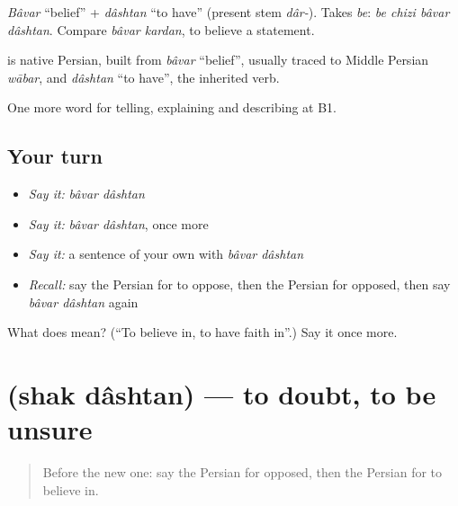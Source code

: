 \emph{Bâvar} \textquotedblleft{}belief\textquotedblright{} + \emph{dâshtan} \textquotedblleft{}to have\textquotedblright{} (present stem \emph{dâr-}). Takes \emph{be}: \emph{be chizi bâvar dâshtan}. Compare \emph{bâvar kardan}, to believe a statement.

\begin{cousinweb}
\textbf{ } is native Persian, built from \emph{bâvar} \textquotedblleft{}belief\textquotedblright{}, usually traced to Middle Persian \emph{wābar}, and \emph{dâshtan} \textquotedblleft{}to have\textquotedblright{}, the inherited verb.
\end{cousinweb}

\begin{grammarlens}[title={What you've built}]
One more word for telling, explaining and describing at B1.
\end{grammarlens}

\subsection*{Your turn}
\begin{itemize}
\raggedright
  \item \emph{Say it:} \emph{bâvar dâshtan}
  \item \emph{Say it:} \emph{bâvar dâshtan}, once more
  \item \emph{Say it:} a sentence of your own with \emph{bâvar dâshtan}
  \item \emph{Recall:} say the Persian for to oppose, then the Persian for opposed, then say \emph{bâvar dâshtan} again
\end{itemize}

\begin{tcolorbox}[breakable,colback=teal!4,colframe=teal!35!black,title={Before you move on}]
What does   mean? (\textquotedblleft{}To believe in, to have faith in\textquotedblright{}.) Say it once more.
\end{tcolorbox}
\section[\texorpdfstring{\fa{شک} \fa{داشتن} (shak dâshtan)}{شک داشتن (shak dâshtan)}]{  (shak dâshtan) — to doubt, to be unsure}

\label{lesson:FA-C361-shak-dashtan}



\begin{quote}
Before the new one: say the Persian for opposed, then the Persian for to believe in.
\end{quote}

